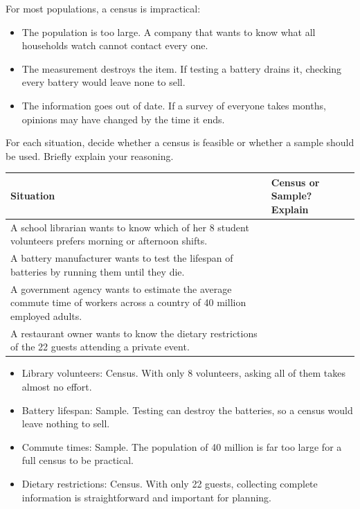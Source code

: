 For most populations, a census is impractical:

\begin{itemize}
    \item The population is too large. A company that wants to know what all households watch cannot contact every one.
    \item The measurement destroys the item. If testing a battery drains it, checking every battery would leave none to sell.
    \item The information goes out of date. If a survey of everyone takes months, opinions may have changed by the time it ends.
\end{itemize}

\begin{Exercise}[title={Census or Sample?}, label={ex:census-or-sample}]
For each situation, decide whether a census is feasible or whether a sample should be used. Briefly explain your 
reasoning.

\medskip
\begin{tabular}{|p{}|p{}|}
\hline
Situation & Census or Sample? Explain \\
\hline
A school librarian wants to know which of her 8 student volunteers prefers morning or afternoon shifts. & \\[2.5em]
\hline
A battery manufacturer wants to test the lifespan of batteries by running them until they die. & \\[2.5em]
\hline
A government agency wants to estimate the average commute time of workers across a country of 40 million employed adults. & \\[2.5em]
\hline
A restaurant owner wants to know the dietary restrictions of the 22 guests attending a private event. & \\[2.5em]
\hline
\end{tabular}
\end{Exercise}
\begin{Answer}[ref={ex:census-or-sample}]
\begin{itemize}
    \item Library volunteers: Census. With only 8 volunteers, asking all of them takes almost no effort.
    \item Battery lifespan: Sample. Testing can destroy the batteries, so a census would leave nothing to sell.
    \item Commute times: Sample. The population of 40 million is far too large for a full census to be practical.
    \item Dietary restrictions: Census. With only 22 guests, collecting complete information is straightforward 
    and important for planning.
\end{itemize}
\end{Answer}

